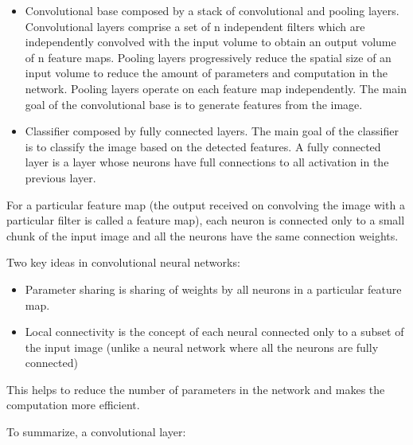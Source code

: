 \begin{itemize}
    \item Convolutional base composed by a stack of convolutional and pooling layers. Convolutional layers comprise a set of n independent filters which are independently convolved with the input volume to obtain an output volume of n feature maps. Pooling layers progressively reduce the spatial size of an input volume to reduce the amount of parameters and computation in the network. Pooling layers operate on each feature map independently. The main goal of the convolutional base is to generate features from the image.
    \item Classifier composed by fully connected layers. The main goal of the classifier is to classify the image based on the detected features. A fully connected layer is a layer whose neurons have full connections to all activation in the previous layer.
\end{itemize}

For a particular feature map (the output received on convolving the image with a particular filter is called a feature map), each neuron is connected only to a small chunk of the input image and all the neurons have the same connection weights.

Two key ideas in convolutional neural networks:

\begin{itemize}
    \item Parameter sharing is sharing of weights by all neurons in a particular feature map.
    \item Local connectivity is the concept of each neural connected only to a subset of the input image (unlike a neural network where all the neurons are fully connected)
\end{itemize}

This helps to reduce the number of parameters in the network and makes the computation more efficient.

To summarize, a convolutional layer:

